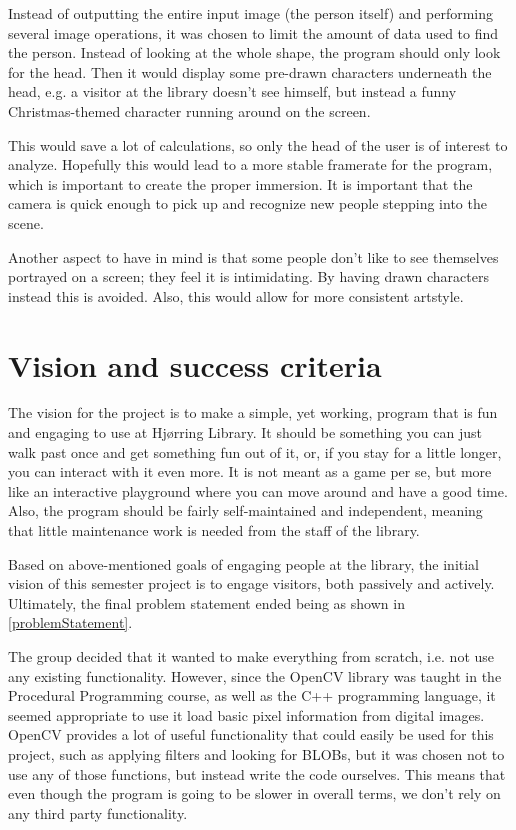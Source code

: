 Instead of outputting the entire input image (the person itself) and performing several image operations, it was chosen to limit the amount of data used to find the person. Instead of looking at the whole shape, the program should only look for the head. Then it would display some pre-drawn characters underneath the head, e.g. a visitor at the library doesn't see himself, but instead a funny Christmas-themed character running around on the screen.

This would save a lot of calculations, so only the head of the user is of interest to analyze. Hopefully this would lead to a more stable framerate for the program, which is important to create the proper immersion. It is important that the camera is quick enough to pick up and recognize new people stepping into the scene.

Another aspect to have in mind is that some people don't like to see themselves portrayed on a screen; they feel it is intimidating. By having drawn characters instead this is avoided. Also, this would allow for more consistent artstyle.
  
\section{Vision and success criteria}
The vision for the project is to make a simple, yet working, program that is fun and engaging to use at Hj{\o}rring Library. It should be something you can just walk past once and get something fun out of it, or, if you stay for a little longer, you can interact with it even more. It is not meant as a game per se, but more like an interactive playground where you can move around and have a good time. Also, the program should be fairly self-maintained and independent, meaning that little maintenance work is needed from the staff of the library.

Based on above-mentioned goals of engaging people at the library, the initial vision of this semester project is to engage visitors, both passively and actively. Ultimately, the final problem statement ended being as shown in \ref{problemStatement}.

The group decided that it wanted to make everything from scratch, i.e. not use any existing functionality. However, since the OpenCV library was taught in the Procedural Programming course, as well as the C++ programming language, it seemed appropriate to use it load basic pixel information from digital images. OpenCV provides a lot of useful functionality that could easily be used for this project, such as applying filters and looking for BLOBs, but it was chosen not to use any of those functions, but instead write the code ourselves. This means that even though the program is going to be slower in overall terms, we don't rely on any third party functionality.

